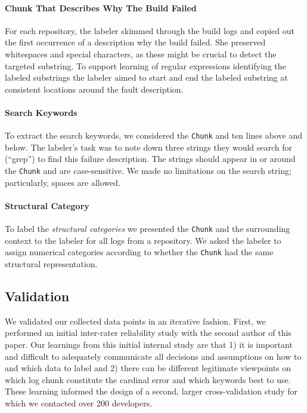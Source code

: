 \documentclass[sigconf]{acmart}
\begin{document}
\paragraph{Chunk That Describes Why The Build Failed}
For each repository, the labeler skimmed through the build logs and copied out the first occurrence of a description why the build failed.
She preserved whitespaces and special characters, as these might be crucial to detect the targeted substring.
To support learning of regular expressions identifying the labeled substrings the labeler aimed to start and end the labeled substring at consistent locations around the fault description.

\paragraph{Search Keywords}
To extract the search keywords, we considered the \texttt{Chunk} and ten lines above and below.
The labeler's task was to note down three strings they would search for (``grep'') to find this failure description.
The strings should appear in or around the \texttt{Chunk} and are case-sensitive.
We made no limitations on the search string; particularly, spaces are allowed.

\paragraph{Structural Category}
To label the \emph{structural categories} we presented the \texttt{Chunk} and the surrounding context to the labeler for all logs from a repository.
We asked the labeler to assign numerical categories according to whether the \texttt{Chunk} had the same structural representation.


\subsection{Validation}
\label{sec:validation}

We validated our collected data points in an iterative fashion. First,
we performed an initial inter-rater reliability study with the second author of this paper. Our learnings from this
initial internal study are that  1) it is important and difficult to
adequately communicate all decisions and assumptions on how to and which data to
label and 2) there can be different legitimate viewpoints on
which log chunk constitute the cardinal error and which keywords best to use. These learning informed the design of a second, larger cross-validation study for which we contacted over 200 developers.
\end{document}
